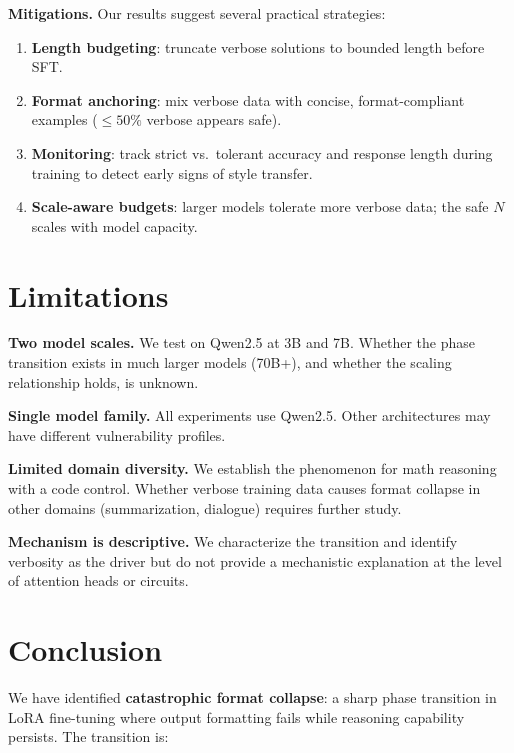 \documentclass{article}
\begin{document}
\textbf{Mitigations.} Our results suggest several practical strategies:
\begin{enumerate}
    \item \textbf{Length budgeting}: truncate verbose solutions to bounded length before SFT.
    \item \textbf{Format anchoring}: mix verbose data with concise, format-compliant examples (${\leq}50\%$ verbose appears safe).
    \item \textbf{Monitoring}: track strict vs.\ tolerant accuracy and response length during training to detect early signs of style transfer.
    \item \textbf{Scale-aware budgets}: larger models tolerate more verbose data; the safe $N$ scales with model capacity.
\end{enumerate}

\section{Limitations}

\textbf{Two model scales.} We test on Qwen2.5 at 3B and 7B. Whether the phase transition exists in much larger models (70B+), and whether the scaling relationship holds, is unknown.

\textbf{Single model family.} All experiments use Qwen2.5. Other architectures may have different vulnerability profiles.

\textbf{Limited domain diversity.} We establish the phenomenon for math reasoning with a code control. Whether verbose training data causes format collapse in other domains (summarization, dialogue) requires further study.

\textbf{Mechanism is descriptive.} We characterize the transition and identify verbosity as the driver but do not provide a mechanistic explanation at the level of attention heads or circuits.

\section{Conclusion}

We have identified \textbf{catastrophic format collapse}: a sharp phase transition in LoRA fine-tuning where output formatting fails while reasoning capability persists. The transition is:
\end{document}
